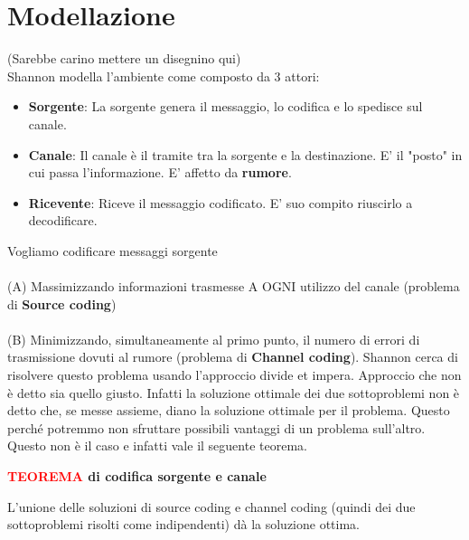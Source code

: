 \documentclass{article}
\begin{document}
    \section{Modellazione}
    (Sarebbe carino mettere un disegnino qui)\\
    Shannon modella l'ambiente come composto da 3 attori:
    \begin{itemize}
        \item \textbf{Sorgente}: La sorgente genera il messaggio, lo codifica e lo spedisce sul canale.
        \item \textbf{Canale}: Il canale è il tramite tra la sorgente e la destinazione. E' il "posto" in cui passa l'informazione. E' affetto da \textbf{rumore}.
        \item \textbf{Ricevente}: Riceve il messaggio codificato. E' suo compito riuscirlo a decodificare.
    \end{itemize}
    \vspace{10px}
    Vogliamo codificare messaggi sorgente \\ \\ (A) Massimizzando informazioni trasmesse A OGNI utilizzo del canale (problema di \textbf{Source coding}) \\ \\ (B) Minimizzando, simultaneamente al primo punto, il numero di errori di trasmissione dovuti al rumore (problema di \textbf{Channel coding}).
    \vspace{5px}
    Shannon cerca di risolvere questo problema usando l'approccio divide et impera. Approccio che non è detto sia quello giusto. Infatti la soluzione ottimale dei due sottoproblemi non è detto che, se messe assieme, diano la soluzione ottimale per il problema. Questo perché potremmo non sfruttare possibili vantaggi di un problema sull'altro.\\
    Questo non è il caso e infatti vale il seguente teorema.
    \vspace{5px}
    \begin{tcolorbox}
        \textbf{\textcolor{red}{TEOREMA} di codifica sorgente e canale}
        \vspace{5px}
        \begin{center}
            L'unione delle soluzioni di source coding e channel coding (quindi dei due sottoproblemi risolti come indipendenti) dà la soluzione ottima.
        \end{center}
    \end{tcolorbox}

    \vspace{10px}
\end{document}
